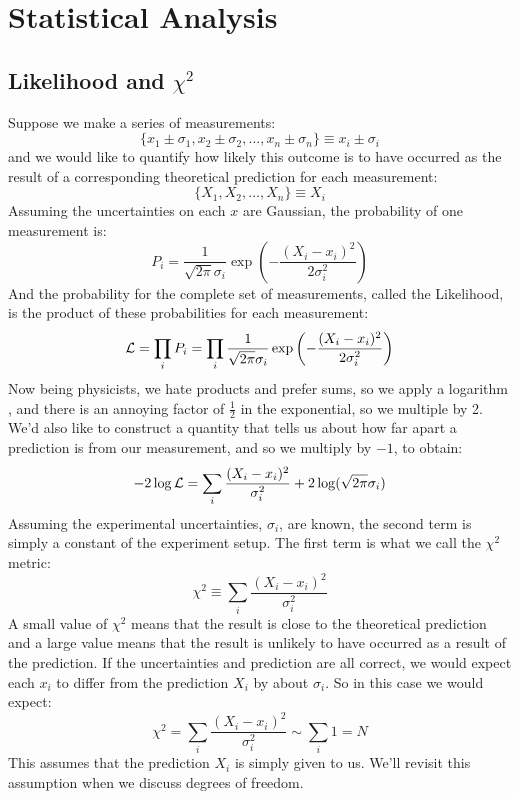 \documentclass[12pt,oneside]{book}
\begin{document}
\chapter{Statistical Analysis}

\section{Likelihood and $\chi^2$}

Suppose we make a series of measurements:
\begin{displaymath}
\{x_1 \pm \sigma_1, x_2 \pm \sigma_2, \ldots, x_n \pm \sigma_n \} \equiv x_i \pm \sigma_i
\end{displaymath}
and we would like to quantify how likely this outcome is to have occurred as the result of a corresponding theoretical prediction for each measurement:
\begin{displaymath}
\{X_1, X_2, \ldots, X_n \} \equiv X_i
\end{displaymath}
Assuming the uncertainties on each $x$ are Gaussian, the probability of one measurement is:
\begin{displaymath}
P_i = \frac{1}{\sqrt{2 \pi} \sigma_i}  \exp\left( - \frac{(X_i-x_i)^2}{2\sigma_i^2}\right)
\end{displaymath}
And the probability for the complete set of measurements, called the Likelihood, is the product of these probabilities for each measurement:
\begin{displaymath}
{\cal L} = \prod_i P_i = \prod_i \frac{1}{\sqrt{2 \pi} \sigma_i}  \exp\left( - \frac{(X_i-x_i)^2}{2\sigma_i^2}\right)
\end{displaymath}
Now being physicists, we hate products and prefer sums, so we apply a logarithm , and there is an annoying factor of $\frac{1}{2}$ in the exponential, so we multiple by 2.  We'd also like to construct a quantity that tells us about how far apart a prediction is from our measurement, and so we multiply by $-1$, to obtain:
\begin{equation}
-2 \log {\cal L} = \sum_i \frac{(X_i-x_i)^2}{\sigma_i^2} + 2 \log(\sqrt{2\pi}\sigma_i)
\end{equation}
Assuming the experimental uncertainties, $\sigma_i$, are known, the second term is simply a constant of the experiment setup.  The first term is what we call the $\chi^2$ metric:
\begin{equation}
\chi^2 \equiv \sum_i \frac{(X_i-x_i)^2}{\sigma_i^2} 
\end{equation}
A small value of $\chi^2$ means that the result is close to the theoretical prediction and a large value means that the result is unlikely to have occurred as a result of the prediction.  If the uncertainties and prediction are all correct, we would expect each $x_i$ to differ from the prediction $X_i$ by about $\sigma_i$.  So in this case we would expect:
\begin{equation}
\chi^2 = \sum_i \frac{(X_i-x_i)^2}{\sigma_i^2} \sim \sum_i 1 = N
\end{equation}
This assumes that the prediction $X_i$ is simply given to us.  We'll revisit this assumption when we discuss degrees of freedom.
\end{document}
